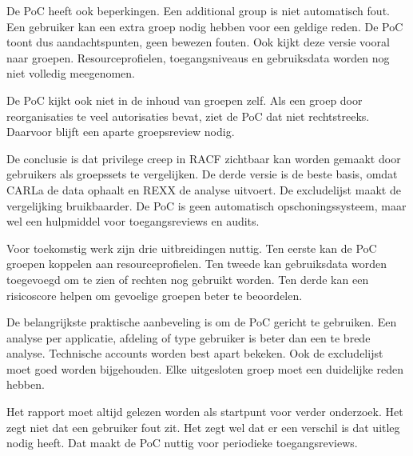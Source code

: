 De PoC heeft ook beperkingen. Een additional group is niet automatisch fout. Een gebruiker kan een extra groep nodig hebben voor een geldige reden. De PoC toont dus aandachtspunten, geen bewezen fouten. Ook kijkt deze versie vooral naar groepen. Resourceprofielen, toegangsniveaus en gebruiksdata worden nog niet volledig meegenomen.

De PoC kijkt ook niet in de inhoud van groepen zelf. Als een groep door reorganisaties te veel autorisaties bevat, ziet de PoC dat niet rechtstreeks. Daarvoor blijft een aparte groepsreview nodig.

De conclusie is dat privilege creep in RACF zichtbaar kan worden gemaakt door gebruikers als groepssets te vergelijken. De derde versie is de beste basis, omdat CARLa de data ophaalt en REXX de analyse uitvoert. De excludelijst maakt de vergelijking bruikbaarder. De PoC is geen automatisch opschoningssysteem, maar wel een hulpmiddel voor toegangsreviews en audits.

Voor toekomstig werk zijn drie uitbreidingen nuttig. Ten eerste kan de PoC groepen koppelen aan resourceprofielen. Ten tweede kan gebruiksdata worden toegevoegd om te zien of rechten nog gebruikt worden. Ten derde kan een risicoscore helpen om gevoelige groepen beter te beoordelen.

De belangrijkste praktische aanbeveling is om de PoC gericht te gebruiken. Een analyse per applicatie, afdeling of type gebruiker is beter dan een te brede analyse. Technische accounts worden best apart bekeken. Ook de excludelijst moet goed worden bijgehouden. Elke uitgesloten groep moet een duidelijke reden hebben.

Het rapport moet altijd gelezen worden als startpunt voor verder onderzoek. Het zegt niet dat een gebruiker fout zit. Het zegt wel dat er een verschil is dat uitleg nodig heeft. Dat maakt de PoC nuttig voor periodieke toegangsreviews.
